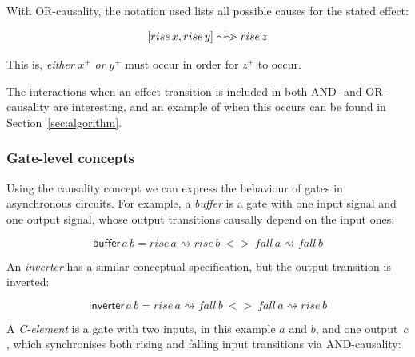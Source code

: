 \documentclass[british,conference,compsoc]{IEEEtran}
\begin{document}
With OR-causality, the notation used lists all possible causes for the stated 
effect:

\vspace{-2mm}

\[
[rise\,x, rise\,y]\sim\hspace{-1.5mm}|\hspace{-1.5mm}\sim\hspace{-1.5mm}>rise\,z
\]

\vspace{-1mm}

This is, \emph{either} $x^{+}$ \emph{or} $y^{+}$ must occur in order for 
$z^{+}$ to occur.

The interactions when an effect transition is included in both AND- and 
OR-causality are interesting, and an example of when this occurs can be found 
in Section~\ref{sec:algorithm}.

\vspace{-2mm}

\subsubsection{Gate-level concepts} Using the causality concept we can express
the behaviour of gates in asynchronous circuits. For example, a \emph{buffer}
is a gate with one input signal and one output signal,
whose output transitions causally depend on the input ones:

\vspace{-4mm}

\[
\mathsf{buffer}\,a\,b=rise\,a\rightsquigarrow rise\,b\ <>\
fall\,a\rightsquigarrow fall\,b
\]

\vspace{-1mm}

\noindent An \emph{inverter} has a similar conceptual specification, but the
output transition is inverted:

\vspace{-4mm}

\[
\mathsf{inverter}\,a\,b=rise\,a\rightsquigarrow fall\,b\ <>\
fall\,a\rightsquigarrow rise\,b
\]

\vspace{-1mm}

\noindent A \emph{C-element} is a gate with two inputs, in this example $a$ and $b$, and one
output~$c$, which synchronises both rising and falling input transitions
via AND-causality:

\vspace{-3mm}
\end{document}

